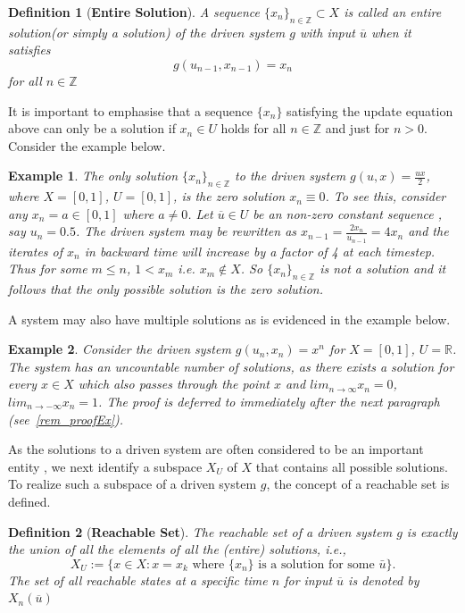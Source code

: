 \documentclass[a4paper,12pt,twoside]{report}
\newtheorem{Definition}{Definition}[]
\newtheorem{Example}{Example}[]
\begin{document}
\begin{Definition}
  [\bf Entire Solution] \label{Dfn_Soln} \rm
  A sequence $\{x_n\}_{n\in\mathbb{Z}}\subset X$ is called an entire solution(or simply a solution) of the driven system  $g$ with input $\overline{u}$ when it satisfies 
  \[g(u_{n-1}, x_{n-1})=x_n\] for all $n\in\mathbb{Z}$
\end{Definition}

It is important to emphasise that a sequence $\{x_n\}$ satisfying the update equation above can only be a solution if $x_n\in{U}$ holds for all $n\in\mathbb{Z}$ and just for $n>0$. Consider the example below.

\begin{Example} \rm \label{ex_halfux}
  The only solution  $\{x_n\}_{n\in\mathbb{Z}}$ to the driven system  $g(u,x)=\frac{ux}{2}$, where $X=[0,1]$, $U=[0,1]$,  is the zero solution $x_n\equiv0$.
  To see this, consider any $x_n=a\in[0,1]$ where $a\neq{0}$.  Let $\overline{u}\in{U}$ be an non-zero constant sequence , say $u_n=0.5$. 
  The driven system may be rewritten as $x_{n-1}=\frac{2x_n}{u_{n-1}}=4x_n$ and the  iterates of $x_n$ in backward time will increase by a factor of 4 at each timestep. 
  Thus for some $m\leq{n}$,  $1<x_m$ i.e. $x_m\notin{X}$. So ${\{x_n\}}_{n\in\mathbb{Z}}$ is not a solution and it follows that the only possible solution is the zero solution.
\end{Example}


A system may also have multiple solutions as is evidenced in the example below.

\begin{Example}\label{Ex_exp} \rm 
 Consider the driven system $g(u_n,x_n)=x^n$ for $X=[0,1]$, $U=\mathbb{R}$. The system has an uncountable number of solutions, as there exists a solution for every $x\in{X}$ which also passes through the point $x$ and $lim_{n\to\infty}x_n=0$, $lim_{n\to{-}\infty}x_n=1$. 
 The proof is deferred to immediately after the next paragraph (see~\ref{rem_proofEx}).
\end{Example}

As the solutions to a driven system are often considered to be an important entity \cite{M: edited the sentence here}, we next identify a subspace $X_U$ of $X$ that contains all possible solutions. To realize such a subspace of a driven system $g$, the concept of a reachable set is defined.

\begin{Definition}
  [\bf Reachable Set]\label{Dfn_ReachableSet}\rm
The reachable set of a driven system $g$ is exactly the union of all the elements of all the (entire) solutions, i.e., 
\[X_U :=\Big \{x \in X:  x = x_k \mbox{ where  $\{x_n\}$  is a solution for some  $\bar{u}$} \Big \}.\]
The set of all reachable states at a specific time $n$ for input $\overline{u}$ is denoted by $X_n(\overline{u})$
\end{Definition}
\end{document}
